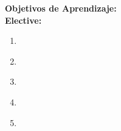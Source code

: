\noindent \textbf{Objetivos de Aprendizaje:}\\
\noindent \textbf{Elective:}
\begin{enumerate}
	\setcounter{enumi}{0}
	\item \ISNaturalLanguageProcessingLODefineAnd\xspace[\ISNaturalLanguageProcessingLODefineAndLevel]\label{sec:BOK:ISNaturalLanguageProcessingLODefineAnd}
	\item \ISNaturalLanguageProcessingLOSimulate\xspace[\ISNaturalLanguageProcessingLOSimulateLevel]\label{sec:BOK:ISNaturalLanguageProcessingLOSimulate}
	\item \ISNaturalLanguageProcessingLOIdentifyTheRepresenting\xspace[\ISNaturalLanguageProcessingLOIdentifyTheRepresentingLevel]\label{sec:BOK:ISNaturalLanguageProcessingLOIdentifyTheRepresenting}
	\item \ISNaturalLanguageProcessingLOListTheUsing\xspace[\ISNaturalLanguageProcessingLOListTheUsingLevel]\label{sec:BOK:ISNaturalLanguageProcessingLOListTheUsing}
	\item \ISNaturalLanguageProcessingLOIdentifyTechniques\xspace[\ISNaturalLanguageProcessingLOIdentifyTechniquesLevel]\label{sec:BOK:ISNaturalLanguageProcessingLOIdentifyTechniques}
\end{enumerate}


